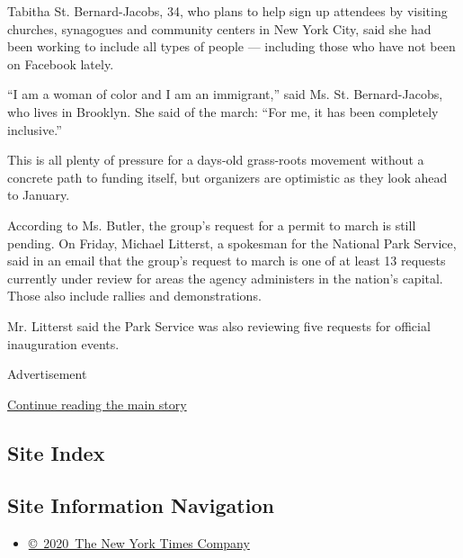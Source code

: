 Tabitha St. Bernard-Jacobs, 34, who plans to help sign up attendees by
visiting churches, synagogues and community centers in New York City,
said she had been working to include all types of people --- including
those who have not been on Facebook lately.

``I am a woman of color and I am an immigrant,'' said Ms. St.
Bernard-Jacobs, who lives in Brooklyn. She said of the march: ``For me,
it has been completely inclusive.''

This is all plenty of pressure for a days-old grass-roots movement
without a concrete path to funding itself, but organizers are optimistic
as they look ahead to January.

According to Ms. Butler, the group's request for a permit to march is
still pending. On Friday, Michael Litterst, a spokesman for the National
Park Service, said in an email that the group's request to march is one
of at least 13 requests currently under review for areas the agency
administers in the nation's capital. Those also include rallies and
demonstrations.

Mr. Litterst said the Park Service was also reviewing five requests for
official inauguration events.

Advertisement

\protect\hyperlink{after-bottom}{Continue reading the main story}

\hypertarget{site-index}{%
\subsection{Site Index}\label{site-index}}

\hypertarget{site-information-navigation}{%
\subsection{Site Information
Navigation}\label{site-information-navigation}}

\begin{itemize}
\tightlist
\item
  \href{https://help.nytimes3xbfgragh.onion/hc/en-us/articles/115014792127-Copyright-notice}{©~2020~The
  New York Times Company}
\end{itemize}

